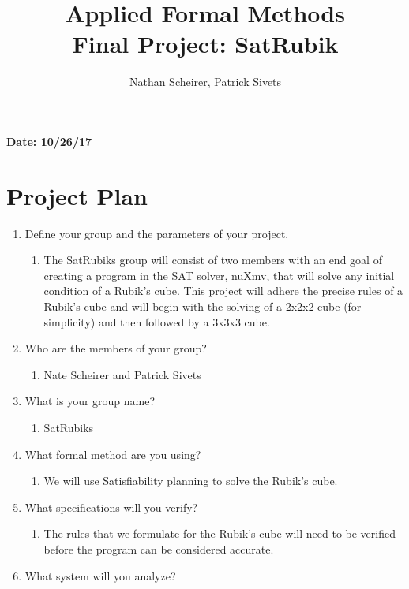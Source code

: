 \documentclass{elsarticle} %
\begin{document}
\title{Applied Formal Methods\\ Final Project: SatRubik}

\author{Nathan Scheirer, Patrick Sivets}

\maketitle


{\bf Date: 10/26/17}


\section{Project Plan}
\begin{enumerate}
\item Define your group and the parameters of your project.
	\begin{enumerate}
	\item The SatRubiks group will consist of two members with an end goal of creating a program in the SAT solver, nuXmv, that will solve any initial condition of a Rubik's cube. This project will adhere the precise rules of a Rubik's cube and will begin with the solving of a 2x2x2 cube (for simplicity) and then followed by a 3x3x3 cube.
	\end{enumerate}
\item Who are the members of your group?
	\begin{enumerate}
	\item Nate Scheirer and Patrick Sivets
	\end{enumerate}
\item What is your group name?
	\begin{enumerate}
	\item SatRubiks
	\end{enumerate}
\item What formal method are you using?
	\begin{enumerate}
	\item We will use Satisfiability planning to solve the Rubik's cube.
	\end{enumerate}
\item What specifications will you verify?
	\begin{enumerate}
	\item The rules that we formulate for the Rubik's cube will need to be verified before the program can be considered accurate.
	\end{enumerate}
\item What system will you analyze?

\end{enumerate}
\end{document}
